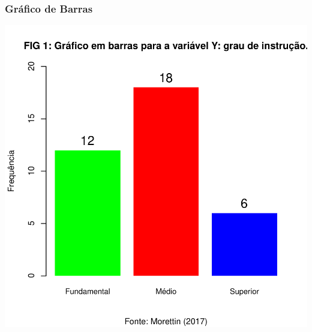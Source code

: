 \documentclass[14pt,aspectratio=1610]{beamer}
\begin{document}
\begin{frame}{}
\frametitle{Gráfico de Barras}
\begin{block}{}
\begin{center}
\includegraphics{Aula4-bp1}
\end{center}
\end{block}
\end{frame}
\end{document}
